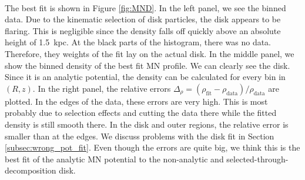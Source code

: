 \\The best fit is shown in Figure \ref{fig:MND}. In the left panel, we see the binned data. Due to the kinematic selection of disk particles, the disk appears to be flaring. This is negligible since the density falls off quickly above an absolute height of \SI{1.5}{kpc}. At the black parts of the histogram, there was no data. Therefore, they weights of the fit lay on the actual disk. In the middle panel, we show the binned density of the best fit \ac{MN} profile. We can clearly see the disk. Since it is an analytic potential, the density can be calculated for every bin in $(R, z)$. In the right panel, the relative errors \(\Delta_\rho = (\rho_{\mathrm{fit}}- \rho_{\mathrm{data}})/\rho_{\mathrm{data}}\) are plotted. In the edges of the data, these errors are very high. This is most probably due to selection effects and cutting the data there while the fitted density is still smooth there. In the disk and outer regions, the relative error is smaller than at the edges. We discuss problems with the disk fit in Section \ref{subsec:wrong_pot_fit}. Even though the errors are quite big, we think this is the best fit of the analytic \ac{MN} potential to the non-analytic and selected-through-decomposition disk. 


